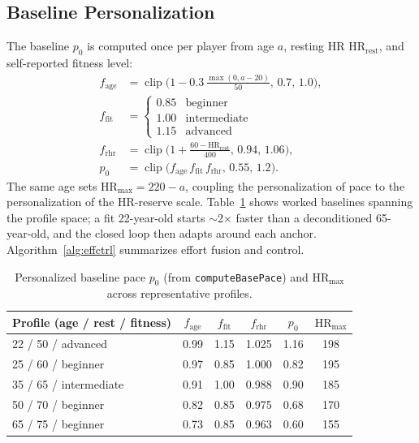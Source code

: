 \documentclass[journal,10pt]{IEEEtran}
\newcommand{\hmax}{\mathrm{HR}_{\max}}
\newcommand{\hrrest}{\mathrm{HR}_{\mathrm{rest}}}
\newcommand{\clip}{\operatorname{clip}}
\begin{document}
\subsection{Baseline Personalization}
The baseline $p_0$ is computed once per player from age $a$, resting HR
$\hrrest$, and self-reported fitness level:
\begin{align}
f_{\text{age}} &= \clip\!\bigl(1-0.3\,\tfrac{\max(0,a-20)}{50},\,0.7,\,1.0\bigr),\\
f_{\text{fit}} &= \begin{cases}0.85 & \text{beginner}\\ 1.00 & \text{intermediate}\\ 1.15 & \text{advanced}\end{cases}\\
f_{\text{rhr}} &= \clip\!\bigl(1+\tfrac{60-\hrrest}{400},\,0.94,\,1.06\bigr),\\
p_0 &= \clip\!\bigl(f_{\text{age}}\,f_{\text{fit}}\,f_{\text{rhr}},\,0.55,\,1.2\bigr).
\end{align}
The same age sets $\hmax=220-a$, coupling the personalization of pace to the
personalization of the HR-reserve scale. Table~\ref{tab:personalization} shows
worked baselines spanning the profile space; a fit 22-year-old starts $\sim$2$\times$
faster than a deconditioned 65-year-old, and the closed loop then adapts around
each anchor. Algorithm~\ref{alg:effctrl} summarizes effort fusion and control.

\begin{table}[t]
\caption{Personalized baseline pace $p_0$ (from \texttt{computeBasePace}) and
$\hmax$ across representative profiles.}
\label{tab:personalization}
\centering
\footnotesize
\begin{tabular}{@{}lccccc@{}}
\toprule
Profile (age / rest / fitness) & $f_{\text{age}}$ & $f_{\text{fit}}$ & $f_{\text{rhr}}$ & $p_0$ & $\hmax$\\
\midrule
22 / 50 / advanced      & 0.99 & 1.15 & 1.025 & 1.16 & 198\\
25 / 60 / beginner      & 0.97 & 0.85 & 1.000 & 0.82 & 195\\
35 / 65 / intermediate  & 0.91 & 1.00 & 0.988 & 0.90 & 185\\
50 / 70 / beginner      & 0.82 & 0.85 & 0.975 & 0.68 & 170\\
65 / 75 / beginner      & 0.73 & 0.85 & 0.963 & 0.60 & 155\\
\bottomrule
\end{tabular}
\end{table}
\end{document}
